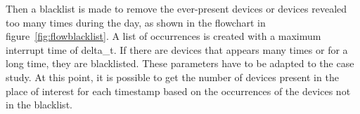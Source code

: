 
Then a blacklist is made to remove the ever-present devices or devices revealed too many times during the day, as shown in the flowchart in figure~\ref{fig:flowblacklist}. A list of occurrences is created with a maximum interrupt time of delta\_t. If there are devices that appears many times or for a long time, they are blacklisted. These parameters have to be adapted to the case study.
At this point, it is possible to get the number of devices present in the place of interest for each timestamp based on the occurrences of the devices not in the blacklist.


